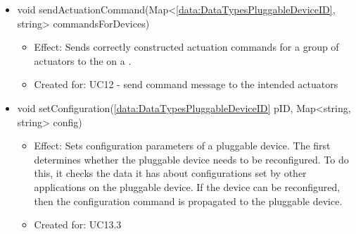 \begin{description}
\begin{itemize}[noitemsep,nolistsep,leftmargin=-.25cm]
\begin{itemize}
        \end{itemize}
      \item \textsf{void sendActuationCommand(Map\textless{}\ref{data:DataTypesPluggableDeviceID}, string\textgreater{} commandsForDevices)}
        \begin{itemize}[noitemsep,nolistsep]
           \item Effect: Sends correctly constructed actuation commands for a group of actuators to the  on a .
\item Created for: UC12 - send command message to the intended actuators
        \end{itemize}
      \item \textsf{void setConfiguration(\ref{data:DataTypesPluggableDeviceID} pID, Map\textless{}string, string\textgreater{} config)}
        \begin{itemize}[noitemsep,nolistsep]
           \item Effect: Sets configuration parameters of a pluggable device. The  first determines whether the pluggable device needs to be reconfigured. To do this, it checks the data it has about configurations set by other applications on the pluggable device. If the device can be reconfigured, then the configuration command is propagated to the pluggable device.
\item Created for: UC13.3
        \end{itemize}
    \end{itemize}
    \end{description}

